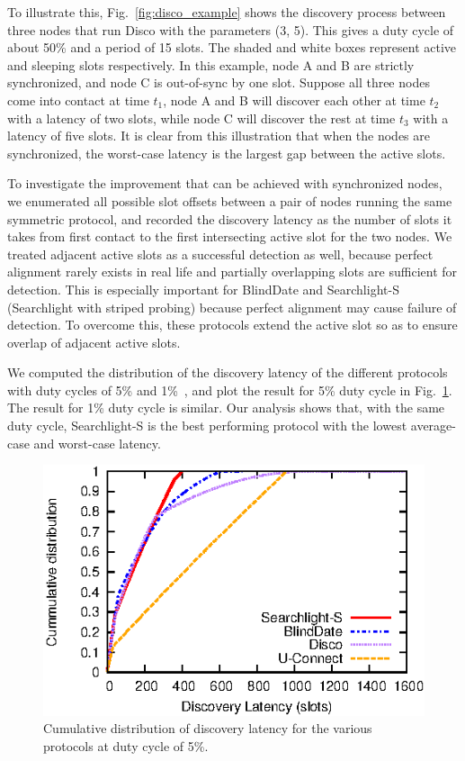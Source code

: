 \documentclass[twoside,twocolumn]{article}
\begin{document}
To illustrate this, Fig.~\ref{fig:disco_example} shows the discovery
process between three nodes that run Disco with the parameters (3, 5).
This gives a duty cycle of about 50\% and a period of 15 slots.  The
shaded and white boxes represent active and sleeping slots
respectively.  In this example, node A and B are strictly
synchronized, and node C is out-of-sync by one slot. Suppose all three
nodes come into contact at time $t_1$, node A and B will discover each
other at time $t_2$ with a latency of two slots, while node C will
discover the rest at time $t_3$ with a latency of five slots. It is
clear from this illustration that when the nodes are synchronized, the
worst-case latency is the largest gap between the active slots.

To investigate the improvement that can be achieved with synchronized
nodes, we enumerated all possible slot offsets between a pair of nodes
running the same symmetric protocol, and recorded the discovery
latency as the number of slots it takes from first contact to the
first intersecting active slot for the two nodes. We treated adjacent
active slots as a successful detection as well, because perfect
alignment rarely exists in real life and partially overlapping slots
are sufficient for detection. This is especially important for
BlindDate and Searchlight-S (Searchlight with striped probing) because
perfect alignment may cause failure of detection. To overcome this,
these protocols extend the active slot so as to ensure overlap of
adjacent active slots.


We computed the distribution of the discovery latency of the different
protocols with duty cycles of 5\% and
1\%~\citep{wang13blinddate, sun14hello, bakht2012searchlight}, and plot
the result for 5\% duty cycle in Fig.~\ref{fig:latency-cdf}. The
result for 1\% duty cycle is similar. Our analysis shows that, with
the same duty cycle, Searchlight-S is the best performing protocol
with the lowest average-case and worst-case latency.

\begin{figure}[t]
   \centering
   \includegraphics{graphs/analysis/latency-cdf}
   \caption{Cumulative distribution of discovery latency for the
		          various protocols at duty cycle of 5\%.}
   \label{fig:latency-cdf}
\end{figure}
\end{document}
